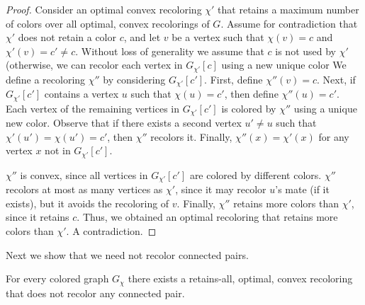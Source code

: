 \begin{proof}
Consider an optimal convex recoloring $\chi'$ that retains a maximum
number of colors over all optimal, 
convex recolorings of $G$.
%
Assume for contradiction that $\chi'$ does not retain a color $c$, 
and let $v$ be a vertex such that $\chi(v) = c$ and $\chi'(v) = c' \neq c$.
%
Without loss of generality we assume that $c$ is not used by $\chi'$ 
(otherwise, we can recolor each vertex in $G_{\chi'}[c]$ using a new unique color%
%
We define a recoloring $\chi''$ by considering $G_{\chi'}[c']$.
%
First, 
define $\chi''(v) = c$.
Next, 
if $G_{\chi'}[c']$ contains a vertex $u$ such that $\chi(u) = c'$, 
then define $\chi''(u) = c'$.
%
Each vertex of the remaining vertices in $G_{\chi'}[c']$ is colored by $\chi''$ 
using a unique new color.
%
Observe that if there exists a second vertex 
$u' \neq u$ such that $\chi'(u') = \chi(u') = c'$, 
then $\chi''$ recolors it.
%
Finally, 
$\chi''(x) = \chi'(x)$ for any vertex $x$ not in $G_{\chi'}[c']$.

$\chi''$ is convex, 
since all vertices in $G_{\chi'}[c']$ are colored by different colors. 
%
$\chi''$ recolors at most as many vertices as $\chi'$, 
since it may recolor $u$'s mate (if it exists), 
but it avoids the recoloring of $v$. 
%
Finally, 
$\chi''$ retains more colors than $\chi'$, 
since it retains $c$.
%
Thus, 
we obtained an optimal recoloring that retains more colors than $\chi'$.  
%
A contradiction.
{}\end{proof}

Next we show that we need not recolor connected pairs.

\begin{lemma}
\label{lm:does_not_recolor_connected_pair}
For every colored graph $G_\chi$ there exists a retains-all,
optimal,
convex recoloring that does not recolor any connected pair.
\end{lemma}


